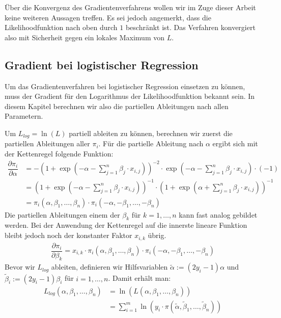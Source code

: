 Über die Konvergenz des Gradientenverfahrens wollen wir im Zuge dieser Arbeit keine weiteren Aussagen treffen. Es sei jedoch angemerkt, dass die Likelihoodfunktion nach oben durch $1$ beschränkt ist. Das Verfahren konvergiert also mit Sicherheit gegen ein lokales Maximum von $L$.

\subsection{Gradient bei logistischer Regression}

Um das Gradientenverfahren bei logistischer Regression einsetzen zu können, muss der Gradient für den Logarithmus der Likelihoodfunktion bekannt sein. In diesem Kapitel berechnen wir also die partiellen Ableitungen nach allen Parametern.

Um $L_{log} = \ln(L)$ partiell ableiten zu können, berechnen wir zuerst die partiellen Ableitungen aller $\pi_i$. Für die partielle Ableitung nach $\alpha$ ergibt sich mit der Kettenregel folgende Funktion:
\begin{align*}
    \dfrac{\partial \pi_i}{\partial \alpha} &= - \left( 1 + \exp \left(- \alpha - \sum_{j=1}^n \beta_j \cdot x_{i, j} \right) \right)^{-2} \cdot \exp \left(- \alpha - \sum_{j=1}^n \beta_j \cdot x_{i, j} \right) \cdot (-1) \\
    &= \left( 1 + \exp \left(- \alpha - \sum_{j=1}^n \beta_j \cdot x_{i, j} \right) \right)^{-1} \cdot \left( 1 + \exp \left(\alpha + \sum_{j=1}^n \beta_j \cdot x_{i, j} \right) \right)^{-1} \\
    &= \pi_i(\alpha, \beta_1, \dots, \beta_n) \cdot \pi_i(- \alpha, - \beta_1, \dots, - \beta_n)
\end{align*}
Die partiellen Ableitungen einem der $\beta_k$ für $k = 1, \dots, n$ kann fast analog gebildet werden. Bei der Anwendung der Kettenregel auf die innerste lineare Funktion bleibt jedoch noch der konstanter Faktor $x_{i, k}$ übrig.
\begin{align*}
    \dfrac{\partial \pi_i}{\partial \beta_k} = x_{i, k} \cdot \pi_i(\alpha, \beta_1, \dots, \beta_n) \cdot \pi_i(- \alpha, - \beta_1, \dots, - \beta_n)
\end{align*}
Bevor wir $L_{log}$ ableiten, definieren wir Hilfsvariablen $\tilde\alpha := (2 y_i - 1) \alpha$ und $\tilde\beta_i := (2 y_i - 1) \beta_i$ für $i = 1, \dots, n$. Damit erhält man:
\begin{align*}
    L_{log}(\alpha, \beta_1, \dots, \beta_n) &= \ln(L(\alpha, \beta_1, \dots, \beta_n)) \\
    &= \sum_{i=1}^m \ln \left(y_i \cdot \pi(\tilde\alpha, \tilde\beta_1, \dots, \tilde\beta_n) \right)
\end{align*}
